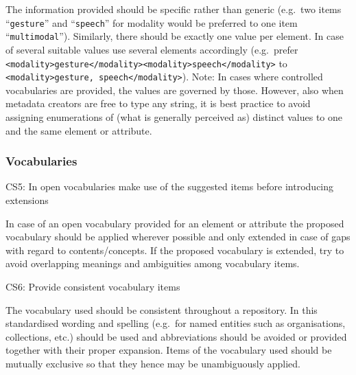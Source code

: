 The information provided should be specific rather than generic
(e.g.~two items ``\texttt{gesture}'' and ``\texttt{speech}'' for modality would be preferred to one item ``\texttt{multimodal}''). Similarly, there should be exactly one value per element. In case of several suitable values use several elements accordingly (e.g.~prefer
\texttt{\textless{}modality\textgreater{}gesture\textless{}/modality\textgreater{}\textless{}modality\textgreater{}speech\textless{}/modality\textgreater{}} to \texttt{\textless{}modality\textgreater{}gesture,\ speech\textless{}/modality\textgreater{}}). Note: In cases where controlled vocabularies are provided, the values are governed by those. However, also when metadata creators are free to type any string, it is best practice to avoid assigning enumerations of (what is generally perceived as) distinct values to one and the same element or attribute.

\subsubsection{Vocabularies}\label{vocabularies}

CS5: In open vocabularies make use of the suggested items before introducing extensions

 

In case of an open vocabulary provided for an element or attribute the proposed vocabulary should be applied wherever possible and only extended in case of gaps with regard to contents/concepts. If the proposed vocabulary is extended, try to avoid overlapping meanings and ambiguities among vocabulary items.


\label{cs6}
CS6: Provide consistent vocabulary items


The vocabulary used should be consistent throughout a repository. In this standardised wording and spelling (e.g.~for named entities such as organisations, collections, etc.) should be used and abbreviations should be avoided or provided together with their proper expansion. Items of the vocabulary used should be mutually exclusive so that they hence may be unambiguously applied.
